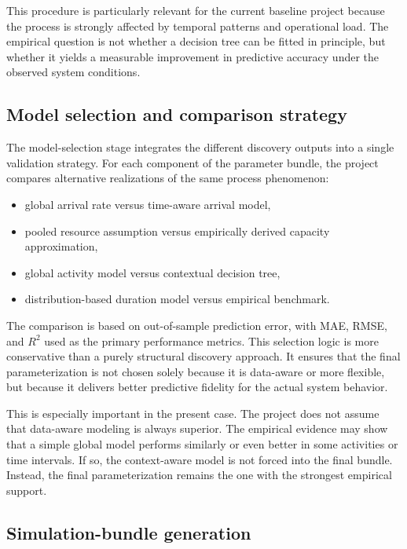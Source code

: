 This procedure is particularly relevant for the current baseline project because the process is strongly affected by temporal patterns and operational load.
The empirical question is not whether a decision tree can be fitted in principle, but whether it yields a measurable improvement in predictive accuracy under the observed system conditions.

\subsection{Model selection and comparison strategy}

The model-selection stage integrates the different discovery outputs into a single validation strategy.
For each component of the parameter bundle, the project compares alternative realizations of the same process phenomenon:
\begin{itemize}
    \item global arrival rate versus time-aware arrival model,
    \item pooled resource assumption versus empirically derived capacity approximation,
    \item global activity model versus contextual decision tree,
    \item distribution-based duration model versus empirical benchmark.
\end{itemize}

The comparison is based on out-of-sample prediction error, with MAE, RMSE, and $R^2$ used as the primary performance metrics.
This selection logic is more conservative than a purely structural discovery approach.
It ensures that the final parameterization is not chosen solely because it is data-aware or more flexible, but because it delivers better predictive fidelity for the actual system behavior.

This is especially important in the present case.
The project does not assume that data-aware modeling is always superior.
The empirical evidence may show that a simple global model performs similarly or even better in some activities or time intervals.
If so, the context-aware model is not forced into the final bundle.
Instead, the final parameterization remains the one with the strongest empirical support.

\subsection{Simulation-bundle generation}


